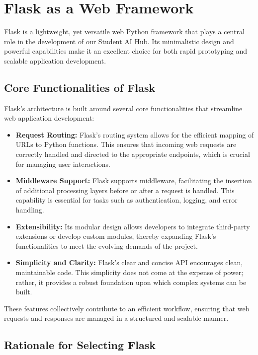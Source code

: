\section{Flask as a Web Framework}

Flask is a lightweight, yet versatile web Python framework that plays a central role in the development of our Student AI Hub. Its minimalistic design and powerful capabilities make it an excellent choice for both rapid prototyping and scalable application development.

\subsection{Core Functionalities of Flask}

Flask's architecture is built around several core functionalities that streamline web application development:
\begin{itemize}
    \item \textbf{Request Routing:} Flask’s routing system allows for the efficient mapping of URLs to Python functions. This ensures that incoming web requests are correctly handled and directed to the appropriate endpoints, which is crucial for managing user interactions.
    \item \textbf{Middleware Support:} Flask supports middleware, facilitating the insertion of additional processing layers before or after a request is handled. This capability is essential for tasks such as authentication, logging, and error handling.
    \item \textbf{Extensibility:} Its modular design allows developers to integrate third-party extensions or develop custom modules, thereby expanding Flask's functionalities to meet the evolving demands of the project.
    \item \textbf{Simplicity and Clarity:} Flask’s clear and concise API encourages clean, maintainable code. This simplicity does not come at the expense of power; rather, it provides a robust foundation upon which complex systems can be built.
\end{itemize}

These features collectively contribute to an efficient workflow, ensuring that web requests and responses are managed in a structured and scalable manner.

\subsection{Rationale for Selecting Flask}

